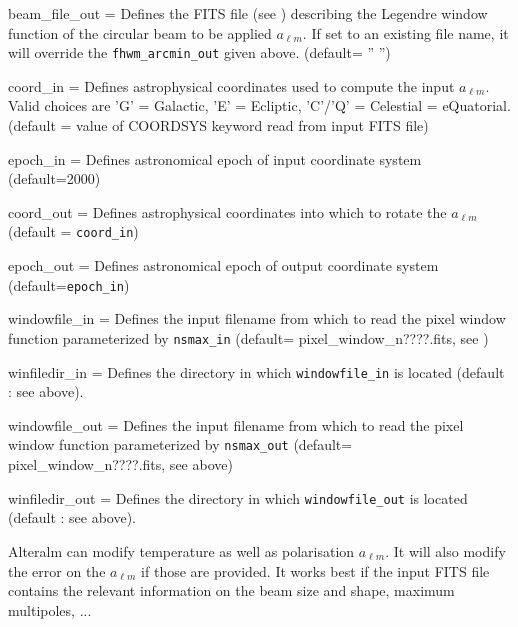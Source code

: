 \begin{qualifiers}
\begin{qulist}{}
    \item[{beam\_file\_out = }] Defines the FITS file 
(see ) describing the
      Legendre window function of the circular beam to be applied $a_{\ell m}$. If
      set to an existing file name, it will override the 
    {\tt fhwm\_arcmin\_out} given above. (default= '' '')
    \item[{coord\_in = }]%
 Defines astrophysical coordinates used to compute the
    input $a_{\ell m}$. Valid choices are 'G' = Galactic, 'E' = Ecliptic, 
    'C'/'Q' = Celestial = eQuatorial. (default = value of COORDSYS keyword read
    from input FITS file)
    \item[{epoch\_in = }]%
 Defines astronomical epoch of input coordinate system (default=2000)
    \item[{coord\_out = }]%
 Defines astrophysical coordinates into which to rotate
    the $a_{\ell m}$ (default = {\tt coord\_in})
    \item[{epoch\_out = }]%
 Defines astronomical epoch of output coordinate system
    (default={\tt epoch\_in})
     \item[{windowfile\_in = }]%
	Defines the input filename from which to read the pixel window function parameterized by {\tt nsmax\_in}
(default= pixel\_window\_n????.fits, see 
%
)
     \item[{winfiledir\_in = }]%
	Defines the directory in which {\tt windowfile\_in}
    is located (default : see above).
     \item[{windowfile\_out = }]%
	Defines the input filename from which to read the pixel window function parameterized by {\tt nsmax\_out}
(default= pixel\_window\_n????.fits, see above)
     \item[{winfiledir\_out = }]%
	Defines the directory in which {\tt windowfile\_out}
    is located (default : see above).

  \end{qulist}
\end{qualifiers}

\begin{codedescription}
{%
Alteralm can modify temperature as well as polarisation $a_{\ell m}$. It will also
modify the error on the $a_{\ell m}$ if those are provided. It works best if the
input FITS file contains the relevant information on the beam size and shape,
maximum multipoles, ...
}
\end{codedescription}

